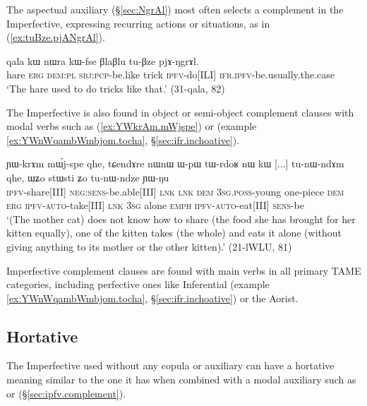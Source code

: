 The aspectual auxiliary  (§\ref{sec:NgrAl}) most often selects a complement in the Imperfective, expressing recurring actions or situations, as in (\ref{ex:tuBze.pjANgrAl}).

\begin{exe}
\ex \label{ex:tuBze.pjANgrAl}
\gll  qala kɯ nɯra kɯ-fse βlaβlu tu-βze pjɤ-ŋgrɤl. \\
hare \textsc{erg} \textsc{dem}:\textsc{pl} \textsc{sbj}:\textsc{pcp}-be.like trick \textsc{ipfv}-do[ILI] \textsc{ifr}.\textsc{ipfv}-be.usually.the.case \\
\glt `The hare used to do tricks like that.' (31-qala, 82)
\end{exe}

The Imperfective is also found in object or semi-object complement clauses with modal verbs such as  (\ref{ex:YWkrAm.mWjspe}) or  (example \ref{ex:YWnWqambWmbjom.tocha}, §\ref{sec:ifr.inchoative}).

\begin{exe}
\ex \label{ex:YWkrAm.mWjspe}
\gll ɲɯ-krɤm mɯ́j-spe qhe, tɕendɤre nɯnɯ ɯ-pɯ tɯ-rdoʁ nɯ kɯ [...] tu-nɯ-ndɤm qhe, ɯʑo stɯsti ʑo tu-nɯ-ndze ɲɯ-ŋu \\
\textsc{ipfv}-share[III] \textsc{neg}:\textsc{sens}-be.able[III] \textsc{lnk} \textsc{lnk} \textsc{dem} \textsc{3sg}.\textsc{poss}-young one-piece \textsc{dem} \textsc{erg} { } \textsc{ipfv}-\textsc{auto}-take[III] \textsc{lnk} \textsc{3sg} alone \textsc{emph} \textsc{ipfv}-\textsc{auto}-eat[III] \textsc{sens}-be \\
\glt `(The mother cat) does not know how to share (the food she has brought for her kitten equally), one of the kitten takes (the whole) and eats it alone (without giving anything to its mother or the other kitten).' (21-lWLU, 81)
\end{exe}

Imperfective complement clauses are found with main verbs in all primary TAME categories, including perfective ones like Inferential (example \ref{ex:YWnWqambWmbjom.tocha}, §\ref{sec:ifr.inchoative}) or the Aorist.


\subsection{Hortative} \label{sec:ipfv.hortative}
The Imperfective used without any copula or auxiliary can have a hortative meaning similar to the one it has when combined with a modal auxiliary such as  or  (§\ref{sec:ipfv.complement}). 

